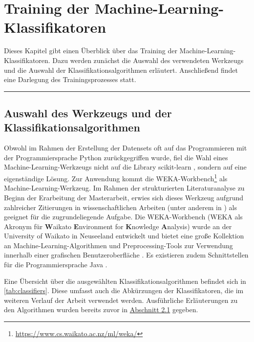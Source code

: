 
\chapter{Training der Machine-Learning-Klassifikatoren}
\label{training}

Dieses Kapitel gibt einen Überblick über das Training der Machine-Learning-Klassifikatoren. Dazu werden zunächst die Auswahl des verwendeten Werkzeugs und die Auswahl der Klassifikationsalgorithmen erläutert. Anschließend findet eine Darlegung des Trainingsprozesses statt.
\\
\hrule

\section{Auswahl des Werkzeugs und der Klassifikationsalgorithmen}

Obwohl im Rahmen der Erstellung der Datensets oft auf das Programmieren mit der Programmiersprache Python zurückgegriffen wurde, fiel die Wahl eines Machine-Learning-Werkzeugs nicht auf die Library scikit-learn \cite{scikit}, sondern auf eine eigenständige Lösung. Zur Anwendung kommt die WEKA-Workbench\footnote{\href{https://www.cs.waikato.ac.nz/ml/weka/}{https://www.cs.waikato.ac.nz/ml/weka/}} als Machine-Learning-Werkzeug. Im Rahmen der strukturierten Literaturanalyse zu Beginn der Erarbeitung der Masterarbeit, erwies sich dieses Werkzeug aufgrund zahlreicher Zitierungen in wissenschaftlichen Arbeiten (unter anderem in \cite{Hammouri2018,Queiroz2016,Ratzinger2008}) als geeignet für die zugrundeliegende Aufgabe. Die WEKA-Workbench (WEKA als Akronym für \textbf{W}aikato \textbf{E}nvironment for \textbf{K}nowledge \textbf{A}nalysis) wurde an der University of Waikato in Neuseeland entwickelt und bietet eine große Kollektion an Machine-Learning-Algorithmen und Preprocessing-Tools zur Verwendung innerhalb einer grafischen Benutzeroberfläche \cite{Weka2016}. Es existieren zudem Schnittstellen für die Programmiersprache Java \cite{Weka2016}.

Eine Übersicht über die ausgewählten Klassifikationsalgorithmen befindet sich in \autoref{tab:classifiers}. Diese umfasst auch die Abkürzungen der Klassifikatoren, die im weiteren Verlauf der Arbeit verwendet werden. Ausführliche Erläuterungen zu den Algorithmen wurden bereits zuvor in \hyperref[algorithms]{Abschnitt 2.1} gegeben.

